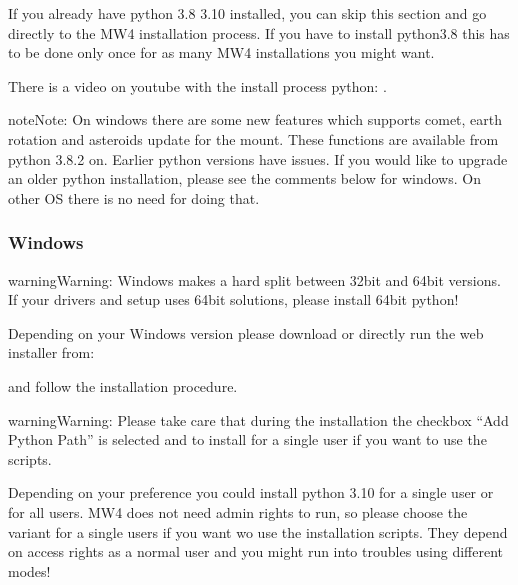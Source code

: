 \documentclass[a4paper,10pt,english]{sphinxmanual}
\begin{document}
\sphinxAtStartPar
If you already have python 3.8 \sphinxhyphen{} 3.10 installed, you can skip this section
and go directly to the MW4 installation process. If you have to install python3.8
this has to be done only once for as many MW4 installations you might want.

\sphinxAtStartPar
There is a video on youtube with the install process python: .

\begin{sphinxadmonition}{note}{Note:}
\sphinxAtStartPar
On windows there are some new features which supports comet,
earth rotation and asteroids update for the mount. These functions are
available from python 3.8.2 on. Earlier python versions have issues. If you
would like to upgrade an older python installation, please see the comments
below for windows. On other OS there is no need for doing that.
\end{sphinxadmonition}


\subsubsection{Windows}
\label{\detokenize{install/python:windows}}
\begin{sphinxadmonition}{warning}{Warning:}
\sphinxAtStartPar
Windows makes a hard split between 32bit and 64bit versions. If your
drivers and setup uses 64bit solutions, please install 64bit python!
\end{sphinxadmonition}

\sphinxAtStartPar
Depending on your Windows version please download or directly run the web
installer from:

\sphinxAtStartPar
{}

\sphinxAtStartPar
and follow the installation procedure.

\begin{sphinxadmonition}{warning}{Warning:}
\sphinxAtStartPar
Please take care that during the installation the checkbox “Add Python Path”
is selected and to install for a single user if you want to use the scripts.
\end{sphinxadmonition}


\sphinxAtStartPar
Depending on your preference you could install python 3.10 for a single user or for
all users. MW4 does not need admin rights to run, so please choose the variant for
a single users if you want wo use the installation scripts. They depend on access
rights as a normal user and you might run into troubles using different modes!
\end{document}
